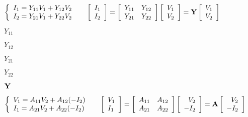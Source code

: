 \documentclass{article}
\def\lthtmlcheckvsize{\ifdim\ht\sizebox<\vsize 
  \ifdim\wd\sizebox<\hsize\expandafter\hfill\fi \expandafter\vfill
  \else\expandafter\vss\fi}%
\begin{document}
{\newpage\clearpage
{}%
$\displaystyle \left\{ \begin{array}{l} I_1=Y_{11}V_1+Y_{12}V_2 \\
I_2=Y_{21}V_1+Y_{22}V_2 \end{array} \right.\;\;\;\;\;
\left[ \begin{array}{l} I_1 \\I_2\end{array} \right]=
\left[ \begin{array}{ll} Y_{11} & Y_{12}\\Y_{21} & Y_{22}\end{array}\right]
\left[ \begin{array}{l} V_1 \\V_2\end{array} \right]
={\bf Y}\left[ \begin{array}{l} V_1 \\V_2\end{array} \right]$%
\lthtmlindisplaymathZ
\lthtmlcheckvsize\clearpage}

{\newpage\clearpage
{}%
$ Y_{11}$%
\lthtmlindisplaymathZ
\lthtmlcheckvsize\clearpage}

{\newpage\clearpage
{}%
$ Y_{12}$%
\lthtmlindisplaymathZ
\lthtmlcheckvsize\clearpage}

{\newpage\clearpage
{}%
$ Y_{21}$%
\lthtmlindisplaymathZ
\lthtmlcheckvsize\clearpage}

{\newpage\clearpage
{}%
$ Y_{22}$%
\lthtmlindisplaymathZ
\lthtmlcheckvsize\clearpage}

{\newpage\clearpage
{}%
$ {\bf Y}$%
\lthtmlindisplaymathZ
\lthtmlcheckvsize\clearpage}

{\newpage\clearpage
{}%
$\displaystyle \left\{ \begin{array}{l}
V_1=A_{11}V_2+A_{12}(-I_2) \\
I_1=A_{21}V_2+A_{22}(-I_2) \end{array} \right.\;\;\;\;\;
\left[ \begin{array}{l} V_1 \\I_1\end{array} \right]=
\left[ \begin{array}{ll} A_{11} & A_{12}\\A_{21} & A_{22}\end{array}\right]
\left[ \begin{array}{r} V_2 \\-I_2\end{array} \right]
={\bf A}\left[ \begin{array}{r} V_2 \\-I_2\end{array} \right]$%
\lthtmlindisplaymathZ
\lthtmlcheckvsize\clearpage}
\end{document}
